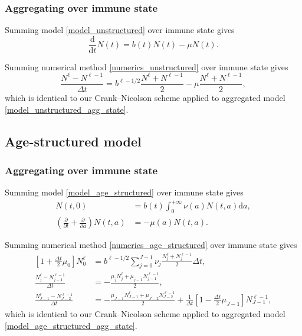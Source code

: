 \documentclass[USenglish]{article}
\newcommand{\md}{\mathrm{d}}
\begin{document}
\subsubsection{Aggregating over immune state}

Summing model \eqref{model_unstructured} over immune state gives
\begin{equation}
  \label{model_unstructured_agg_state}
  \frac{\md}{\md t} N(t)
  = b(t) N(t) - \mu N(t).
\end{equation}

Summing numerical method \eqref{numerics_unstructured} over
immune state gives
\begin{equation}
  \label{numerics_unstructured_agg_state}
  \frac{N^{\ell} - N^{\ell - 1}}{\Delta t}
  = b^{\ell - 1 / 2} \frac{N^{\ell} + N^{\ell - 1}}{2}
  - \mu \frac{N^{\ell} + N^{\ell - 1}}{2},
\end{equation}
which is identical to our Crank--Nicolson scheme applied to aggregated
model \eqref{model_unstructured_agg_state}.


\subsection{Age-structured model}


\subsubsection{Aggregating over immune state}

Summing model \eqref{model_age_structured} over immune state gives
\begin{subequations}
  \label{model_age_structured_agg_state}
  \begin{align}
    N(t, 0)
    &= b(t) \int_0^{+\infty} \nu(a) N(t, a) \md a,
    \\
    \left(\frac{\partial}{\partial t}
      + \frac{\partial}{\partial a}\right)
    N(t, a)
    &= - \mu(a) N(t, a).
  \end{align}
\end{subequations}

Summing numerical method \eqref{numerics_age_structured} over immune
state gives
\begin{subequations}
  \label{numerics_age_structured_agg_state}
  \begin{align}
    \left[1 + \frac{\Delta t}{2} \mu_0\right] N_0^{\ell}
    &= b^{\ell - 1 / 2}
    \sum_{j = 0}^{J - 1} \nu_j \frac{N_j^{\ell} + N_j^{\ell - 1}}{2} \Delta t,
    \\
    \frac{N_j^{\ell} - N_{j - 1}^{\ell - 1}}{\Delta t}
    &= - \frac{\mu_j N_j^{\ell} + \mu_{j - 1} N_{j - 1}^{\ell - 1}}{2},
    \\
    \frac{N_{J - 1}^{\ell} - N_{J - 2}^{\ell - 1}}{\Delta t}
    &= - \frac{\mu_{J - 1} N_{J - 1}^{\ell} + \mu_{J - 2} N_{J - 2}^{\ell - 1}}{2}
    + \frac{1}{\Delta t} \left[
      1 - \frac{\Delta t}{2} \mu_{J - 1}
    \right] N_{J - 1}^{\ell - 1},
  \end{align}
\end{subequations}
which is identical to our Crank--Nicolson scheme applied to aggregated
model \eqref{model_age_structured_agg_state}.
\end{document}
